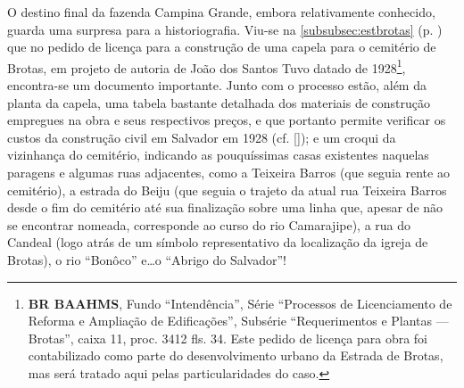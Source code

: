 





















O destino final da fazenda Campina Grande, embora relativamente conhecido, guarda uma surpresa para a historiografia. Viu-se na \autoref{subsubsec:estbrotas} (p. \pageref{subsubsec:estbrotas}) que no pedido de licença para a construção de uma capela para o cemitério de Brotas, em projeto de autoria de João dos Santos Tuvo datado de 1928\footnote{\textbf{BR BAAHMS}, Fundo ``Intendência'', Série ``Processos de Licenciamento de Reforma e Ampliação de Edificações'', Subsérie ``Requerimentos e Plantas --- Brotas'', caixa 11, proc. 3412 fls. 34. Este pedido de licença para obra foi contabilizado como parte do desenvolvimento urbano da Estrada de Brotas, mas será tratado aqui pelas particularidades do caso.}, encontra-se um documento importante. Junto com o processo estão, além da planta da capela, uma tabela bastante detalhada dos materiais de construção empregues na obra e seus respectivos preços, e que portanto permite verificar os custos da construção civil em Salvador em 1928 (cf. \autoref{}); e um croqui da vizinhança do cemitério, indicando as pouquíssimas casas existentes naquelas paragens e algumas ruas adjacentes, como a Teixeira Barros (que seguia rente ao cemitério), a estrada do Beiju (que seguia o trajeto da atual rua Teixeira Barros desde o fim do cemitério até sua finalização sobre uma linha que, apesar de não se encontrar nomeada, corresponde ao curso do rio Camarajipe), a rua do Candeal (logo atrás de um símbolo representativo da localização da igreja de Brotas), o rio ``Bonôco'' e\dots o ``Abrigo do Salvador''!

